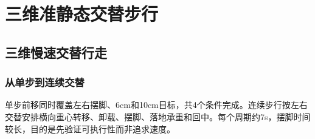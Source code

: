 
\FloatBarrier

\section{三维准静态交替步行}

\label{stage:s26}

\subsection{三维慢速交替行走}\label{s26-detail-1}

\subsubsection{从单步到连续交替}\label{s26-detail-2}

单步前移同时覆盖左右摆脚、6cm和10cm目标，共4个条件完成。连续步行按左右交替安排横向重心转移、卸载、摆脚、落地承重和回中。每个周期约7s，摆脚时间较长，目的是先验证可执行性而非追求速度。

